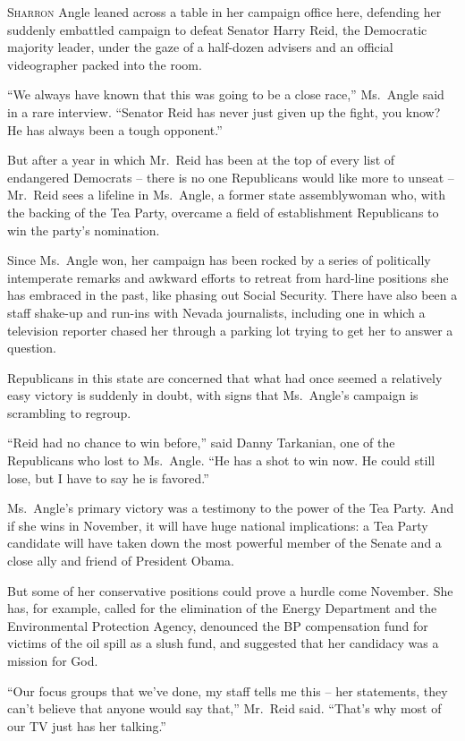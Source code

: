 ﻿\documentclass[12pt]{article}
\begin{document}
\lettrine{S}{harron} Angle leaned across a table in her campaign office
here, defending her suddenly embattled campaign to defeat Senator Harry Reid, the Democratic
majority leader, under the gaze of a half-dozen advisers and an official videographer packed into
the room.

``We always have known that this was going to be a close race,'' Ms.~Angle said in a rare interview.
``Senator Reid has never just given up the fight, you know? He has always been a tough opponent.''

But after a year in which Mr.~Reid has been at the top of every list of endangered Democrats --
there is no one Republicans would like more to unseat -- Mr.~Reid sees a lifeline in Ms.~Angle, a
former state assemblywoman who, with the backing of the Tea Party, overcame a field of establishment
Republicans to win the party's nomination.

Since Ms.~Angle won, her campaign has been rocked by a series of politically intemperate remarks and
awkward efforts to retreat from hard-line positions she has embraced in the past, like phasing out
Social Security. There have also been a staff shake-up and run-ins with Nevada journalists,
including one in which a television reporter chased her through a parking lot trying to get her to
answer a question.

Republicans in this state are concerned that what had once seemed a relatively easy victory is
suddenly in doubt, with signs that Ms.~Angle's campaign is scrambling to regroup.

``Reid had no chance to win before,'' said Danny Tarkanian, one of the Republicans who lost to
Ms.~Angle. ``He has a shot to win now. He could still lose, but I have to say he is favored.''

Ms.~Angle's primary victory was a testimony to the power of the Tea Party. And if she wins in
November, it will have huge national implications: a Tea Party candidate will have taken down the
most powerful member of the Senate and a close ally and friend of President Obama.

But some of her conservative positions could prove a hurdle come November. She has, for example,
called for the elimination of the Energy Department and the Environmental Protection Agency,
denounced the BP compensation fund for victims of the oil spill as a slush fund, and suggested that
her candidacy was a mission for God.

``Our focus groups that we've done, my staff tells me this -- her statements, they can't believe
that anyone would say that,'' Mr.~Reid said. ``That's why most of our TV just has her talking.''
\end{document}

